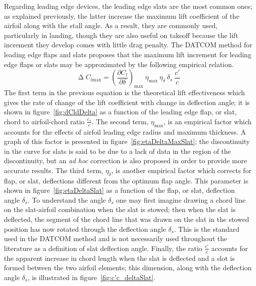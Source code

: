 %
\noindent
Regarding leading edge devices, the leading edge slats are the most common ones; as explained previously, the latter increase the maximum lift coefficient of the airfoil along with the stall angle. As a result, they are commonly used, particularly in landing, though they are also useful on takeoff because the lift increment they develop comes with little drag penalty.
%
The \gls{DATCOM} method for leading edge flaps and slats proposes that the maximum lift increment for leading edge flaps or slats may be approximated by the following empirical relation.
%
\begin{equation}
\upDelta C_{l\text{max}}=\left(\dfrac{\partial C_l}{\partial \delta}\right)_{\text{max}}\ \eta_{\text{max}}\ \eta_\delta\ \delta_s\ \dfrac{c'}{c}
\label{eqn:DeltaClmaxSlat}
\end{equation}
%
\noindent
The first term in the previous equation is the theoretical lift effectiveness which gives the rate of change of the lift coefficient with change in deflection angle; it is shown in figure~\ref{fig:dCldDelta} as a function of the leading edge flap, or slat, chord to airfoil-chord ratio $\frac{c_s}{c}$.
%
The second term, $\eta_{\text{max}}$, is an empirical factor which accounts for the effects of airfoil leading edge radius and maximum thickness. A graph of this factor is presented in figure~\ref{fig:etaDeltaMaxSlat}; the discontinuity in the curve for slats is said to be due to a lack of data in the region of the discontinuity, but an \emph{ad hoc} correction is also proposed in order to provide more accurate results.
%
The third term, $\eta_\delta$, is another empirical factor which corrects for flap, or slat, deflections different from the optimum flap angle. This parameter is shown in figure~\ref{fig:etaDeltaSlat} as a function of the flap, or slat, deflection angle $\delta_s$. To understand the angle $\delta_s$ one may first imagine
drawing a chord line on the slat-airfoil combination when the slat is stowed; then when the slat is deflected, the segment of the chord line that was drawn on
the slat in the stowed position has now rotated through the deflection angle $\delta_s$. This is the standard used in the \gls{DATCOM} method and is not necessarily used throughout the literature as a definition of slat deflection angle.
%
Finally, the ratio $\frac{c'}{c}$ accounts for the apparent increase in chord length when the slat is deflected and a slot is formed between the two airfoil elements; this dimension, along with the deflection angle $\delta_s$, is illustrated in figure~\ref{fig:c'c_deltaSlat}.
